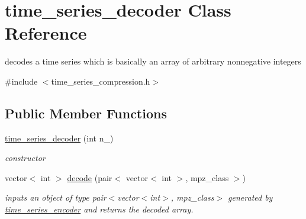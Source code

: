 \hypertarget{classtime__series__decoder}{}\section{time\+\_\+series\+\_\+decoder Class Reference}
\label{classtime__series__decoder}


decodes a time series which is basically an array of arbitrary nonnegative integers  




{\ttfamily \#include $<$time\+\_\+series\+\_\+compression.\+h$>$}

\subsection*{Public Member Functions}
\begin{DoxyCompactItemize}
\item 
\hyperlink{classtime__series__decoder_a087e4c5d516210043e58a4683a767d93}{time\+\_\+series\+\_\+decoder} (int n\+\_\+)
\begin{DoxyCompactList}\small\item\em constructor \end{DoxyCompactList}\item 
vector$<$ int $>$ \hyperlink{classtime__series__decoder_a4b28eb8883c68f5502c43a802424e0c3}{decode} (pair$<$ vector$<$ int $>$, mpz\+\_\+class $>$)
\begin{DoxyCompactList}\small\item\em inputs an object of type {\ttfamily pair$<$vector$<$int$>$, mpz\+\_\+class$>$} generated by {\ttfamily \hyperlink{classtime__series__encoder}{time\+\_\+series\+\_\+encoder}} and returns the decoded array. \end{DoxyCompactList}\end{DoxyCompactItemize}
